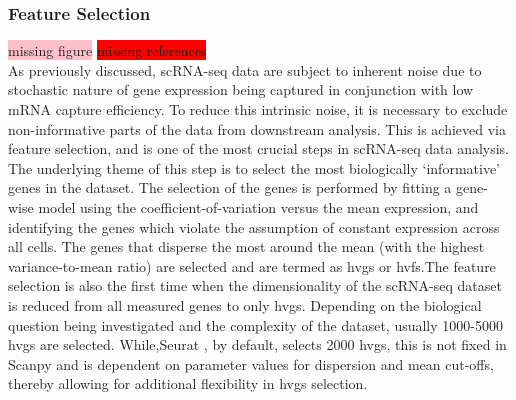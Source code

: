 \subsubsection{Feature Selection}
\colorbox{pink}{missing figure} \colorbox{red}{missing references}\\
As previously discussed, scRNA-seq data are subject to inherent noise due to stochastic nature of gene expression being captured in conjunction with low mRNA capture efficiency. To reduce this intrinsic noise, it is necessary to exclude non-informative parts of the data from downstream analysis. This is achieved via feature selection, and is one of the most crucial steps in scRNA-seq data analysis. The underlying theme of this step is to select the most biologically `informative' genes in the dataset. The selection of the genes is performed by fitting a gene-wise model using the coefficient-of-variation versus the mean expression, and identifying the genes which violate the assumption of constant expression across all cells. The genes that disperse the most around the mean (with the highest variance-to-mean ratio) are selected and are termed as \glspl{hvg} or \glspl{hvf}.The feature selection is also the first time when the dimensionality of the scRNA-seq dataset is reduced from all measured genes to only \glspl{hvg}. Depending on the biological question being investigated and the complexity of the dataset, usually 1000-5000 \glspl{hvg} are selected. While,Seurat \textbf{\cite{butler_integrating_2018,stuart_comprehensive_2019,hao_integrated_2021}}, by default, selects 2000 \glspl{hvg}, this is not fixed in Scanpy \textbf{\cite{wolf_scanpy_2018}} and is dependent on parameter values for dispersion and mean cut-offs, thereby allowing for additional flexibility in \glspl{hvg} selection.

